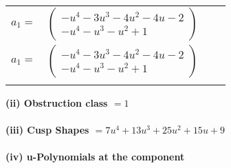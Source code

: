 \documentclass[1p]{elsarticle_modified}
\theoremstyle{definition}
\begin{document}
\begin{tabular}{m{7pt} m{180pt} m{7pt} m{180pt} }
\flushright $a_{1}=$&$\begin{pmatrix}- u^4-3 u^3-4 u^2-4 u-2\\- u^4- u^3- u^2+1\end{pmatrix}$\\ \flushright $a_{1}=$&$\begin{pmatrix}- u^4-3 u^3-4 u^2-4 u-2\\- u^4- u^3- u^2+1\end{pmatrix}$\\&\end{tabular}
\flushleft \textbf{(ii) Obstruction class $= 1$}\\~\\
\flushleft \textbf{(iii) Cusp Shapes $= 7 u^4+13 u^3+25 u^2+15 u+9$}\\~\\
\newpage\renewcommand{\arraystretch}{1}
\flushleft \textbf{(iv) u-Polynomials at the component}\newline \\
\end{document}
